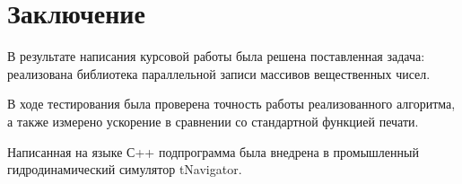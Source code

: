 \section{Заключение}
В результате написания курсовой работы была решена поставленная задача: 
реализована библиотека параллельной записи массивов вещественных чисел.

В ходе тестирования была проверена точность работы реализованного алгоритма, а также измерено ускорение в сравнении со стандартной функцией печати. 

Написанная на языке \textsf{С++} подпрограмма была внедрена в промышленный гидродинамический симулятор \textsf{tNavigator}.

